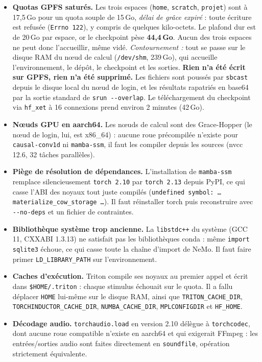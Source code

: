 \documentclass[11pt,a4paper]{article}
\begin{document}
\begin{warnbox}
\begin{itemize}
\item \textbf{Quotas GPFS saturés.} Les trois espaces (\texttt{home},
  \texttt{scratch}, \texttt{projet}) sont à 17,5\,Go pour un quota souple de
  15\,Go, \emph{délai de grâce expiré} : toute écriture est refusée
  (\texttt{Errno 122}), y compris de quelques kilo-octets. Le plafond dur est de
  20\,Go par espace, or le checkpoint pèse \textbf{44,4\,Go}. Aucun des trois
  espaces ne peut donc l'accueillir, même vidé.
  \emph{Contournement :} tout se passe sur le disque RAM du nœud de calcul
  (\texttt{/dev/shm}, 239\,Go), qui accueille l'environnement, le dépôt, le
  checkpoint et les sorties.
  \textbf{Rien n'a été écrit sur GPFS, rien n'a été supprimé.} Les fichiers sont
  poussés par \texttt{sbcast} depuis le disque local du nœud de login, et les
  résultats rapatriés en base64 par la sortie standard de
  \texttt{srun -{}-overlap}. Le téléchargement du checkpoint via \texttt{hf\_xet}
  à 16 connexions prend environ 2 minutes (42\,Go).

\item \textbf{Nœuds GPU en aarch64.} Les nœuds de calcul sont des Grace-Hopper
  (le nœud de login, lui, est x86\_64) : aucune roue précompilée n'existe pour
  \texttt{causal-conv1d} ni \texttt{mamba-ssm}, il faut les compiler depuis les
  sources (nvcc 12.6, 32 tâches parallèles).

\item \textbf{Piège de résolution de dépendances.} L'installation de
  \texttt{mamba-ssm} remplace silencieusement \texttt{torch 2.10} par
  \texttt{torch 2.13} depuis PyPI, ce qui casse l'ABI des noyaux tout juste
  compilés (\texttt{undefined symbol: \dots materialize\_cow\_storage \dots}).
  Il faut réinstaller torch puis reconstruire avec \texttt{-{}-no-deps} et un
  fichier de contraintes.

\item \textbf{Bibliothèque système trop ancienne.} La \texttt{libstdc++} du
  système (GCC 11, CXXABI 1.3.13) ne satisfait pas les bibliothèques conda :
  même \texttt{import sqlite3} échoue, ce qui casse toute la chaîne d'import de
  NeMo. Il faut faire primer \texttt{LD\_LIBRARY\_PATH} sur l'environnement.

\item \textbf{Caches d'exécution.} Triton compile ses noyaux au premier appel et
  écrit dans \texttt{\$HOME/.triton} : chaque stimulus échouait sur le quota. Il
  a fallu déplacer \texttt{HOME} lui-même sur le disque RAM, ainsi que
  \texttt{TRITON\_CACHE\_DIR}, \texttt{TORCHINDUCTOR\_CACHE\_DIR},
  \texttt{NUMBA\_CACHE\_DIR}, \texttt{MPLCONFIGDIR} et \texttt{HF\_HOME}.

\item \textbf{Décodage audio.} \texttt{torchaudio.load} en version 2.10 délègue à
  \texttt{torchcodec}, dont aucune roue compatible n'existe en aarch64 et qui
  exigerait FFmpeg : les entrées/sorties audio sont faites directement en
  \texttt{soundfile}, opération strictement équivalente.
\end{itemize}
\end{warnbox}
\end{document}
